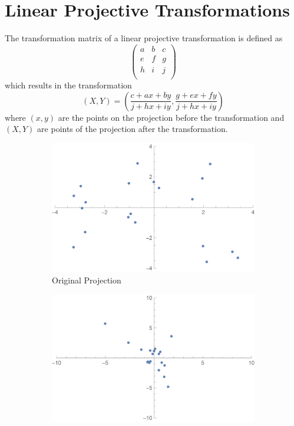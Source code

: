 \documentclass[11pt]{extarticle}
\begin{document}
\section*{Linear Projective Transformations}
The transformation matrix of a linear projective transformation is defined as
\[
\left( 
\begin{array}{ccc}
a & b & c \\
e & f & g \\
h & i & j \\
\end{array}
\right)
\]
which results in the transformation
\[
(X,Y) = \left( \frac{c + a x + b y}{j + h x + i y}, \frac{g + e x + f y}{j + h x + i y} \right) 
\]
where $(x,y)$ are the points on the projection before the transformation and $(X,Y)$ are points of the projection after the transformation.
    \begin{figure}[!ht]
        \centering
        \begin{subfigure}{.3\textwidth}
            \centering
            \includegraphics[scale=.1]{ma1.png}
            \caption{Original Projection}
        \end{subfigure}
        \begin{subfigure}{.3\textwidth}
            \centering
            \includegraphics[scale=.1]{ma2.png}

\end{subfigure}
\end{figure}
\end{document}
